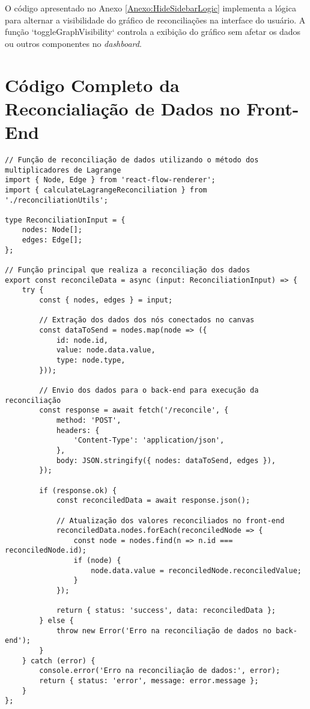 O código apresentado no Anexo \ref{Anexo:HideSidebarLogic} implementa a lógica para alternar a visibilidade do gráfico de reconciliações na interface do usuário. A função `toggleGraphVisibility` controla a exibição do gráfico sem afetar os dados ou outros componentes no \textit{dashboard}.


\chapter{Código Completo da Reconcialiação de Dados no Front-End}
\label{Cap:ReconcileDataCode}

\begin{verbatim}
// Função de reconciliação de dados utilizando o método dos multiplicadores de Lagrange
import { Node, Edge } from 'react-flow-renderer';
import { calculateLagrangeReconciliation } from './reconciliationUtils';

type ReconciliationInput = {
    nodes: Node[];
    edges: Edge[];
};

// Função principal que realiza a reconciliação dos dados
export const reconcileData = async (input: ReconciliationInput) => {
    try {
        const { nodes, edges } = input;

        // Extração dos dados dos nós conectados no canvas
        const dataToSend = nodes.map(node => ({
            id: node.id,
            value: node.data.value,
            type: node.type,
        }));

        // Envio dos dados para o back-end para execução da reconciliação
        const response = await fetch('/reconcile', {
            method: 'POST',
            headers: {
                'Content-Type': 'application/json',
            },
            body: JSON.stringify({ nodes: dataToSend, edges }),
        });

        if (response.ok) {
            const reconciledData = await response.json();

            // Atualização dos valores reconciliados no front-end
            reconciledData.nodes.forEach(reconciledNode => {
                const node = nodes.find(n => n.id === reconciledNode.id);
                if (node) {
                    node.data.value = reconciledNode.reconciledValue;
                }
            });

            return { status: 'success', data: reconciledData };
        } else {
            throw new Error('Erro na reconciliação de dados no back-end');
        }
    } catch (error) {
        console.error('Erro na reconciliação de dados:', error);
        return { status: 'error', message: error.message };
    }
};
\end{verbatim}

